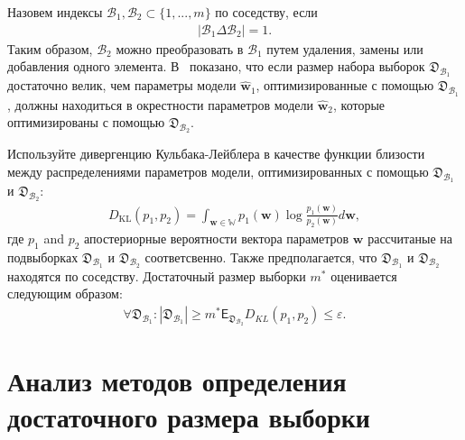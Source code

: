 Назовем индексы $\mathcal{B}_1,\mathcal{B}_2 \subset \{1,...,m\}$ по соседству, если
\[
\label{eq:bs:8}
\begin{aligned}
	\left|\mathcal{B}_1 \Delta \mathcal{B}_2\right| = 1.
\end{aligned}
\]
Таким образом, $\mathcal{B}_2 $ можно преобразовать в $\mathcal{B}_1$ путем удаления, замены или добавления одного элемента. В~\cite{motrenko2014} показано, что если размер набора выборок $\mathfrak {D}_{\mathcal {B}_1}$ достаточно велик, чем параметры модели $\hat{\textbf {w}}_1$, оптимизированные с помощью $\mathfrak{D}_{\mathcal{B}_1}$, должны находиться в окрестности параметров модели $\hat{\textbf{w}}_2 $, которые оптимизированы с помощью $\mathfrak{D}_{\mathcal {B}_2}$.
	 
Используйте дивергенцию Кульбака-Лейблера в качестве функции близости между распределениями параметров модели, оптимизированных с помощью $\mathfrak{D}_{\mathcal{B}_1}$ и $\mathfrak{D}_{\mathcal{B}_2}$:
\[
\label{eq:bs:9}
\begin{aligned}
	D_\text{KL}\left(p_1, p_2\right) = \int_{\textbf{w}\in\mathbb{W}}p_1(\textbf{w})\log\frac{p_1(\textbf{w})}{p_2(\textbf{w})}d\textbf{w},
\end{aligned}
\]
где $p_1$ and $p_2$ апостериорные вероятности вектора параметров $\textbf{w}$ рассчитаные на подвыборках $\mathfrak{D}_{\mathcal{B}_1}$ и $\mathfrak{D}_{\mathcal{B}_2}$ соответсвенно. Также предполагается, что $\mathfrak{D}_{\mathcal{B}_1}$ и $\mathfrak{D}_{\mathcal{B}_2}$ находятся по соседству.
Достаточный размер выборки $m^*$ оценивается следующим образом:
\[
\label{eq:bs:10}
\begin{aligned}
	\forall \mathfrak{D}_{\mathcal{B}_1}: \left|\mathfrak{D}_{\mathcal{B}_1}\right| \geq m^*    \mathsf{E}_{\mathfrak{D}_{\mathcal{B}_2}}D_{KL}\left(p_1, p_2\right) \leq \varepsilon.
\end{aligned}
\]

	  
\section{Анализ методов определения достаточного размера выборки}
\begin{table}[!htp]
\centering
\caption{Описание выборок для анализа качества определения оптимального размера выборки}
\label{table20}
\end{table} 

